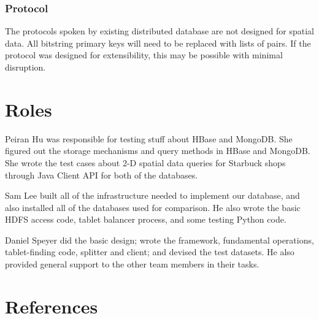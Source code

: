 \documentclass[11pt]{article}
\begin{document}
\subsubsection{Protocol}

The protocols spoken by existing distributed database are not designed for spatial data.  All bitstring primary keys will need to be replaced with lists of pairs.  If the protocol was designed for extensibility, this may be possible with minimal disruption.

\section{Roles}

Peiran Hu was responsible for testing stuff about HBase and MongoDB. She figured out the storage mechanisms and query methods in HBase and MongoDB. She wrote the test cases about 2-D spatial data queries for Starbuck shops through Java Client API for both of the databases.

Sam Lee built all of the infrastructure needed to implement our database, and also installed all of the databases used for comparison. He also wrote the basic HDFS access code, tablet balancer process, and some testing Python code. 

Daniel Speyer did the basic design; wrote the framework, fundamental operations, tablet-finding code, splitter and client; and devised the test datasets.  He also provided general support to the other team members in their tasks.

\section{References}

\raggedright
\end{document}
